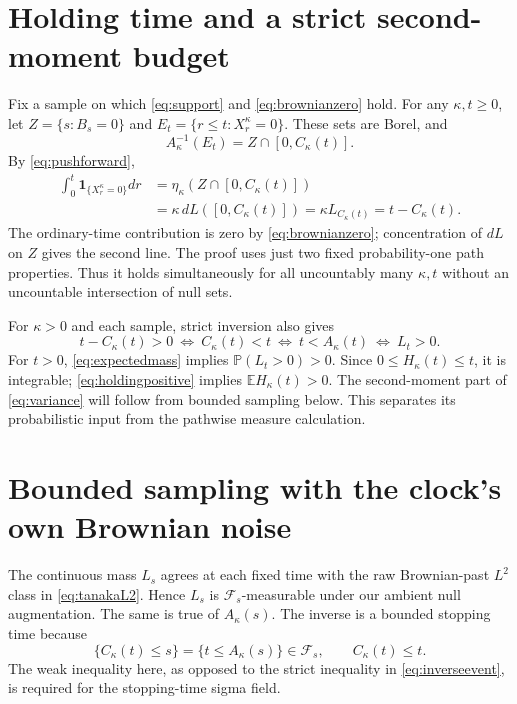 \documentclass[11pt]{article}
\newcommand{\E}{\mathbb E}
\newcommand{\Pp}{\mathbb P}
\newcommand{\ind}{\mathbf1}
\newcommand{\F}{\mathcal F}
\begin{document}
\section{Holding time and a strict second-moment budget}
Fix a sample on which \eqref{eq:support} and
\eqref{eq:brownianzero} hold. For any $\kappa,t\geq0$, let
$Z=\{s:B_s=0\}$ and
$E_t=\{r\leq t:X_r^\kappa=0\}$. These sets are Borel, and
\[
 A_\kappa^{-1}(E_t)=Z\cap[0,C_\kappa(t)].
\]
By \eqref{eq:pushforward},
\begin{align*}
 \int_0^t\ind_{\{X_r^\kappa=0\}}dr
 &=\eta_\kappa(Z\cap[0,C_\kappa(t)])\\
 &=\kappa\,dL([0,C_\kappa(t)])
 =\kappa L_{C_\kappa(t)}=t-C_\kappa(t).
\end{align*}
The ordinary-time contribution is zero by
\eqref{eq:brownianzero}; concentration of $dL$ on $Z$ gives the
second line. The proof uses just two fixed probability-one path
properties. Thus it holds simultaneously for all uncountably many
$\kappa,t$ without an uncountable intersection of null sets.

For $\kappa>0$ and each sample, strict inversion also gives
\begin{equation}\label{eq:holdingpositive}
 t-C_\kappa(t)>0
 \ \Longleftrightarrow\ C_\kappa(t)<t
 \ \Longleftrightarrow\ t<A_\kappa(t)
 \ \Longleftrightarrow\ L_t>0.
\end{equation}
For $t>0$, \eqref{eq:expectedmass} implies
$\Pp(L_t>0)>0$. Since $0\leq H_\kappa(t)\leq t$, it is integrable;
\eqref{eq:holdingpositive} implies $\E H_\kappa(t)>0$.
The second-moment part of \eqref{eq:variance} will follow from
bounded sampling below. This separates its probabilistic input from
the pathwise measure calculation.

\section{Bounded sampling with the clock's own Brownian noise}
The continuous mass $L_s$ agrees at each fixed time with the raw
Brownian-past $L^2$ class in \eqref{eq:tanakaL2}. Hence $L_s$ is
$\F_s$-measurable under our ambient null augmentation. The same is
true of $A_\kappa(s)$. The inverse is a bounded stopping time because
\begin{equation}\label{eq:stopping}
 \{C_\kappa(t)\leq s\}=\{t\leq A_\kappa(s)\}\in\F_s,
 \qquad C_\kappa(t)\leq t.
\end{equation}
The weak inequality here, as opposed to the strict inequality in
\eqref{eq:inverseevent}, is required for the stopping-time sigma field.
\end{document}
